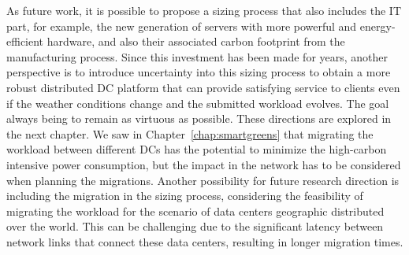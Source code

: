 As future work, it is possible to propose a sizing process that also includes the IT part, for example, the new generation of servers with more powerful and energy-efficient hardware, and also their associated carbon footprint from the manufacturing process. Since this investment has been made for years, another perspective is to introduce uncertainty into this sizing process to obtain a more robust distributed DC platform that can provide satisfying service to clients even if the weather conditions change and the submitted workload evolves. The goal always being to remain as virtuous as possible. These directions are explored in the next chapter.  We saw in Chapter~\ref{chap:smartgreens} that migrating the workload between different DCs has the potential to minimize the high-carbon intensive power consumption, but the impact in the network has to be considered when planning the migrations. Another possibility for future research direction is including the migration in the sizing process, considering the feasibility of migrating the workload for the scenario of data centers geographic distributed over the world. This can be challenging due to the significant latency between network links that connect these data centers, resulting in longer migration times.